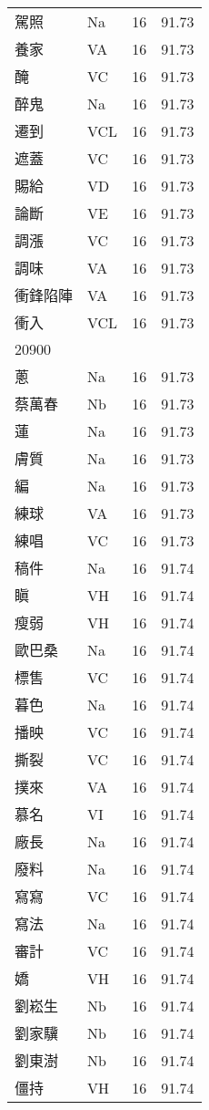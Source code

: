 \documentclass[twocolumn]{book}
\begin{document}
\begin{supertabular}{llrr}
駕照 & Na & 16 &  91.73\\
養家 & VA & 16 &  91.73\\
醃 & VC & 16 &  91.73\\
醉鬼 & Na & 16 &  91.73\\
遷到 & VCL & 16 &  91.73\\
遮蓋 & VC & 16 &  91.73\\
賜給 & VD & 16 &  91.73\\
論斷 & VE & 16 &  91.73\\
調漲 & VC & 16 &  91.73\\
調味 & VA & 16 &  91.73\\
衝鋒陷陣 & VA & 16 &  91.73\\
衝入 & VCL & 16 &  91.73\\
20900\\
蔥 & Na & 16 &  91.73\\
蔡萬春 & Nb & 16 &  91.73\\
蓮 & Na & 16 &  91.73\\
膚質 & Na & 16 &  91.73\\
編 & Na & 16 &  91.73\\
練球 & VA & 16 &  91.73\\
練唱 & VC & 16 &  91.73\\
稿件 & Na & 16 &  91.74\\
瞋 & VH & 16 &  91.74\\
瘦弱 & VH & 16 &  91.74\\
歐巴桑 & Na & 16 &  91.74\\
標售 & VC & 16 &  91.74\\
暮色 & Na & 16 &  91.74\\
播映 & VC & 16 &  91.74\\
撕裂 & VC & 16 &  91.74\\
撲來 & VA & 16 &  91.74\\
慕名 & VI & 16 &  91.74\\
廠長 & Na & 16 &  91.74\\
廢料 & Na & 16 &  91.74\\
寫寫 & VC & 16 &  91.74\\
寫法 & Na & 16 &  91.74\\
審計 & VC & 16 &  91.74\\
嬌 & VH & 16 &  91.74\\
劉崧生 & Nb & 16 &  91.74\\
劉家驥 & Nb & 16 &  91.74\\
劉東澍 & Nb & 16 &  91.74\\
僵持 & VH & 16 &  91.74\\

\end{supertabular}
\end{document}
